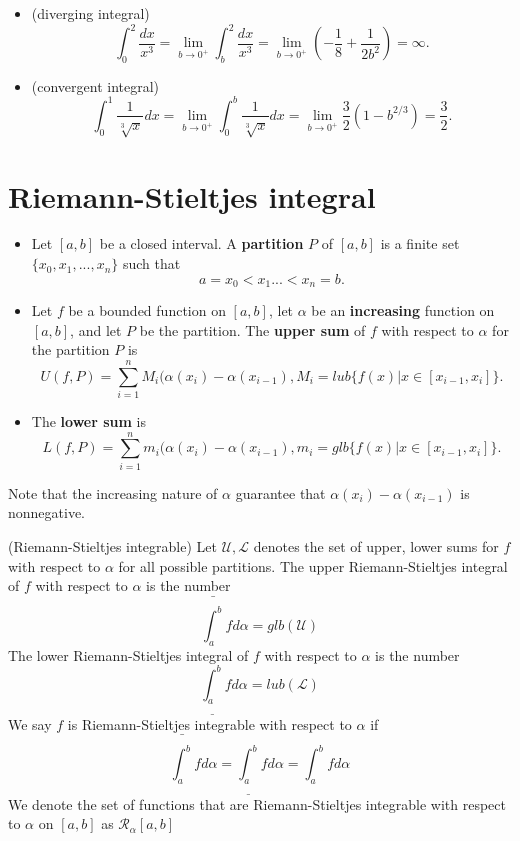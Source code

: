 \begin{refsection}
\begin{example}\cite[584]{larson2009calculus}\hfill
	\begin{itemize}
		\item (diverging integral)$$\int_0^2 \frac{dx}{x^3} = \lim_{b\to 0^+} \int_b^2 \frac{dx}{x^3} = \lim_{b\to 0^+}  (-\frac{1}{8} + \frac{1}{2b^2}) = \infty.$$
		\item (convergent integral)
		$$\int_0^1 \frac{1}{\sqrt[3]{x}}dx = \lim_{b\to 0^+} \int_0^b \frac{1}{\sqrt[3]{x}}dx = \lim_{b\to 0^+}  \frac{3}{2}(1 - b^{2/3}) = \frac{3}{2}.$$
	\end{itemize}	
\end{example}



\section{Riemann-Stieltjes integral}
\begin{definition}\cite[192]{johnsonbaugh2010foundations}\hfill
\begin{itemize}
	\item Let $[a,b]$ be a closed interval. A \textbf{partition} $P$ of $[a,b]$ is a finite set $\{x_0,x_1,...,x_n\}$ such that 
	$$a=x_0 < x_1 ... < x_n =b.$$
	\item Let $f$ be a bounded function on $[a,b]$, let $\alpha$ be an \textbf{increasing} function on $[a,b]$, and let $P$ be the partition. The \textbf{upper sum} of $f$ with respect to $\alpha$ for the partition $P$ is
	$$U(f,P)=\sum_{i=1}^n M_i (\alpha(x_i)-\alpha(x_{i-1}),M_i=lub\{f(x)|x\in[x_{i-1},x_i]\}.$$
	\item  The \textbf{lower sum} is
	$$L(f,P)=\sum_{i=1}^n m_i (\alpha(x_i)-\alpha(x_{i-1}),m_i=glb\{f(x)|x\in[x_{i-1},x_i]\}.$$ 
\end{itemize}	
Note that the increasing nature of $\alpha$ guarantee that $\alpha(x_i)-\alpha(x_{i-1})$ is nonnegative. 
\end{definition}




\begin{definition}
(Riemann-Stieltjes integrable) Let $\mathcal{U},\mathcal{L}$ denotes the set of upper, lower sums for $f$ with respect to $\alpha$ for all possible partitions. The upper Riemann-Stieltjes integral of $f$ with respect to $\alpha$ is the number
$$\bar{\int_a^b} f d\alpha = glb (\mathcal{U})$$
The lower Riemann-Stieltjes integral of $f$ with respect to $\alpha$ is the number
$$\underline{\int_a^b} f d\alpha = lub (\mathcal{L})$$
We say $f$ is Riemann-Stieltjes integrable with respect to $\alpha$ if 
$$\bar{\int_a^b} f d\alpha=\underline{\int_a^b} f d\alpha = \int_a^b f d\alpha$$
We denote the set of functions that are Riemann-Stieltjes integrable with respect to $\alpha$ on $[a,b]$ as $\mathcal{R}_{\alpha}[a,b]$
\end{definition}




\end{refsection}

